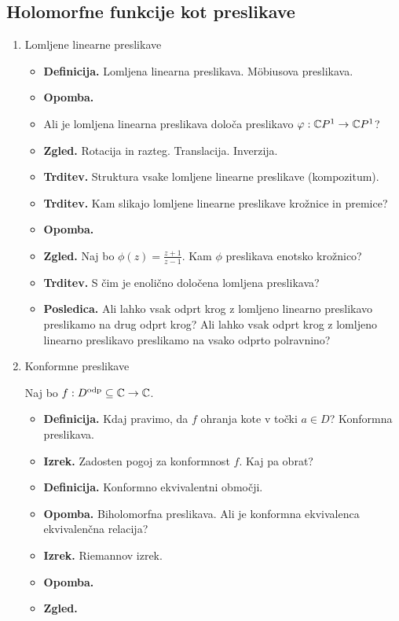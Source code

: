 \subsection{Holomorfne funkcije kot preslikave}
\begin{enumerate}
    \item Lomljene linearne preslikave
    \begin{itemize}
        \item \textbf{Definicija.} Lomljena linearna preslikava. M\"obiusova preslikava.
        \item \textbf{Opomba.} \todo{}
        \item Ali je lomljena linearna preslikava določa preslikavo \(\varphi: \mathbb{C} P^1 \to \mathbb{C} P^1\)?
        \item \textbf{Zgled.} Rotacija in razteg. Translacija. Inverzija.
        \item \textbf{Trditev.} Struktura vsake lomljene linearne preslikave (kompozitum).
        \item \textbf{Trditev.} Kam slikajo lomljene linearne preslikave krožnice in premice?
        \item \textbf{Opomba.} \todo{}
        \item \textbf{Zgled.} Naj bo \(\phi(z) = \frac{z+1}{z-1}\). Kam \(\phi\) preslikava enotsko krožnico?
        \item \textbf{Trditev.} S čim je enolično določena lomljena preslikava?
        \item \textbf{Posledica.} Ali lahko vsak odprt krog z lomljeno linearno preslikavo preslikamo na drug odprt krog? Ali lahko vsak odprt krog z lomljeno linearno preslikavo preslikamo na vsako odprto polravnino?
    \end{itemize}

    \item Konformne preslikave
    
    Naj bo \(f: D^\text{odp} \subseteq \mathbb{C} \to \mathbb{C}\).
    \begin{itemize}
        \item \textbf{Definicija.}  Kdaj pravimo, da \(f\) ohranja kote v točki \(a \in D\)? Konformna preslikava.
        \item \textbf{Izrek.} Zadosten pogoj za konformnost \(f\). Kaj pa obrat?
        \item \textbf{Definicija.} Konformno ekvivalentni območji. 
        \newpage
        \item \textbf{Opomba.} Biholomorfna preslikava. Ali je konformna ekvivalenca ekvivalenčna relacija?
        \item \textbf{Izrek.} Riemannov izrek.
        \item \textbf{Opomba.} \todo{}
        \item \textbf{Zgled.} \todo{}
    \end{itemize} 


\end{enumerate}
